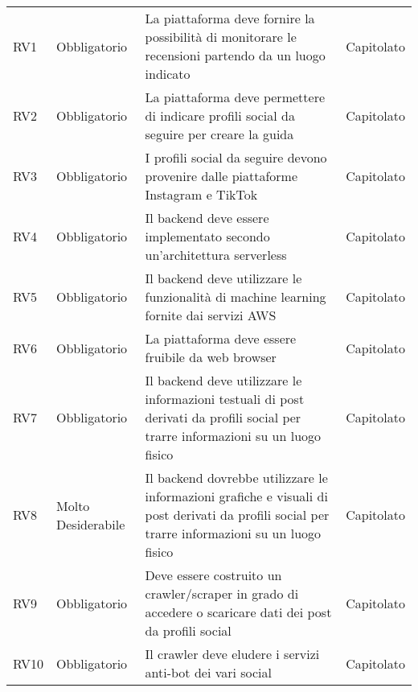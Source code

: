 {\begin{longtable}{C{.257\freewidth} C{.257\freewidth} C{.257\freewidth} C{.257\freewidth}}
      RV1 & Obbligatorio & La piattaforma deve fornire la possibilità di monitorare le recensioni partendo da un luogo indicato & Capitolato \\
      RV2 & Obbligatorio & La piattaforma deve permettere di indicare profili social da seguire per creare la guida & Capitolato \\
      RV3 & Obbligatorio & I profili social da seguire devono provenire dalle piattaforme Instagram e TikTok & Capitolato \\
      RV4 & Obbligatorio & Il backend deve essere implementato secondo un’architettura serverless & Capitolato \\
      RV5 & Obbligatorio & Il backend deve utilizzare le funzionalità di machine learning fornite dai servizi AWS & Capitolato \\
      RV6 & Obbligatorio & La piattaforma deve essere fruibile da web browser & Capitolato \\
      RV7 & Obbligatorio & Il backend deve utilizzare le informazioni testuali di post derivati da profili social per trarre informazioni su un luogo fisico & Capitolato \\
      RV8 & Molto Desiderabile & Il backend dovrebbe utilizzare le informazioni grafiche e visuali di post derivati da profili social per trarre informazioni su un luogo fisico & Capitolato \\
      RV9 & Obbligatorio & Deve essere costruito un crawler/scraper in grado di accedere o scaricare dati dei post da profili social & Capitolato \\
      RV10 & Obbligatorio & Il crawler deve eludere i servizi anti-bot dei vari social & Capitolato \\
      \bottomrule
      \end{longtable}
}
